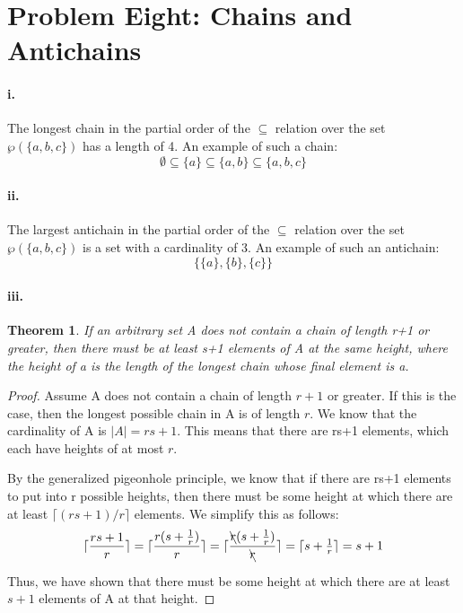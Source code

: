 \documentclass[10pt,letter]{article}
\newtheorem*{thm}{Theorem}
\begin{document}
\section*{Problem Eight: Chains and Antichains}

\paragraph{i.} The longest chain in the partial order of the $\subseteq$ relation over the set $\wp(\{a, b, c\})$ has a length of 4. An example of such a chain:
$$\emptyset \subseteq \{a\} \subseteq \{a, b\} \subseteq \{a, b, c\}$$

\paragraph{ii.} The largest antichain in the partial order of the $\subseteq$ relation over the set $\wp(\{a, b, c\})$ is a set with a cardinality of 3. An example of such an antichain:
$$\{\{a\}, \{b\}, \{c\}\}$$

\paragraph{iii.} 
\begin{thm} If an arbitrary set A does not contain a chain of length r+1 or greater, then there must be at least s+1 elements of A at the same height, where the height of a is the length of the longest chain whose final element is a. \end{thm}
\begin{proof} Assume A does not contain a chain of length $r+1$ or greater. If this is the case, then the longest possible chain in A is of length $r$. We know that the cardinality of A is $|A| = rs+1$. This means that there are rs+1 elements, which each have heights of at most $r$. 

By the generalized pigeonhole principle, we know that if there are rs+1 elements to put into r possible heights, then there must be some height at which there are at least $\lceil (rs+1)/r \rceil$ elements. We simplify this as follows:
$$\lceil \dfrac{rs+1}{r} \rceil = \lceil \dfrac{r(s+\tfrac{1}{r})}{r} \rceil = \lceil \dfrac{\bcancel{r}(s+\tfrac{1}{r})}{\bcancel{r}} \rceil  = \lceil s+\tfrac{1}{r} \rceil = s+1$$

Thus, we have shown that there must be some height at which there are at least $s+1$ elements of A at that height.
\end{proof}
\end{document}
